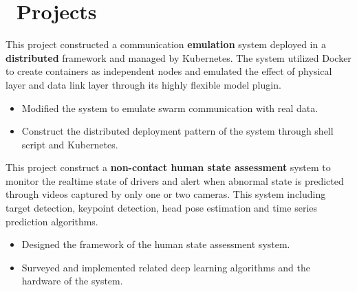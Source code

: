 \documentclass{resume}
\begin{document}
\section{\faTasks\ Projects}

This project constructed a communication \textbf{emulation} system deployed in a \textbf{distributed} framework and managed by Kubernetes. The system utilized Docker to create containers as independent nodes and emulated the effect of physical layer and data link layer through its highly flexible model plugin. 
\begin{itemize}
  \item Modified the system to emulate swarm communication with real data.
  \item Construct the distributed deployment pattern of the system through shell script and Kubernetes.
\end{itemize}
This project construct a \textbf{non-contact human state assessment} system to monitor the realtime state of drivers and alert when abnormal state is predicted through videos captured by only one or two cameras. This system including target detection, keypoint detection, head pose estimation and time series prediction algorithms.
\begin{itemize}
  \item Designed the framework of the human state assessment system.
  \item Surveyed and implemented related deep learning algorithms and the hardware of the system.
\end{itemize}
\end{document}
